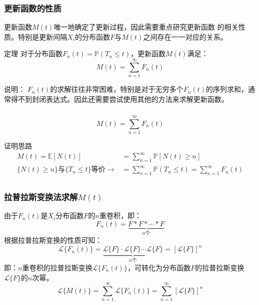 \documentclass[t]{beamer}
\renewcommand{\Pr}{\mathbb{P}}
\newcommand{\E}{\mathbb{E}}
\newcommand{\laplace}[2]{\mathcal{L}\{#1(#2)\}}
\newcommand{\LT}[1]{\mathcal{L}\{#1\}}
\begin{document}
\begin{frame}
  \frametitle{更新函数的性质}
  更新函数$M(t)$唯一地确定了更新过程，因此需要重点研究更新函数
  的相关性质。特别是更新间隔$X_i$的分布函数$F$与$M(t)$之间存在一一对应的关系。
  
\begin{block}{定理}
  对于分布函数$F_n(t)=\Pr(T_n\le t)$，更新函数$M(t)$满足：
  \begin{equation*}
      M(t)=\sum^{\infty}_{n=1}F_n(t)
  \end{equation*}
\end{block}

\begin{block}{说明：}
  $F_{n}(t)$的求解往往非常困难，特别是对于无穷多个$F_{n}(t)$的序列求和，通常得不到封闭表达式。因此还需要尝试使用其他的方法来求解更新函数。
\end{block}
\end{frame}


\begin{frame}
  \frametitle{}
  \begin{equation*}
    M(t)=\sum^{\infty}_{n=1}F_n(t)
\end{equation*}
  \begin{block}{证明思路}
  \begin{equation*}
    \begin{split}
        M(t)=\E[N(t)]&=\sum^{\infty}_{n=1}\Pr[N(t)\ge n]\\
    \{N(t)\ge n\}\text{与}\{T_n\le t\} \text{等价}\to   &=\sum^{\infty}_{n=1}\Pr(T_n\le t)=\sum^{\infty}_{n=1}F_n(t)\\
    \end{split}
\end{equation*}
\end{block}

\end{frame}


\begin{frame}
  \frametitle{拉普拉斯变换法求解$M(t)$}
  由于$F_n(t)$是$X_i$分布函数$F$的$n$重卷积，即：
  \begin{equation*}
      F_n(t) = \underbrace{F*F*\cdots*F}_{n\text{个}}
  \end{equation*}
  根据拉普拉斯变换的性质可知：
\[\laplace{F_n}{t}=\underbrace{\LT{F}\cdot \LT{F}\cdots \LT{F}}_{n\text{个}}=\left[\LT{F}\right]^n\]
即：$n$重卷积的拉普拉斯变换$\laplace{F_n}{t}$，可转化为分布函数$F$的拉普拉斯变换$\LT{F}$的$n$次幂。
\[    \laplace{M}{t}=\sum\limits^{\infty}_{n=1}\laplace{F_n}{t}=\sum\limits^{\infty}_{n=1}[\LT{F}]^n
\]
\end{frame}
\end{document}
